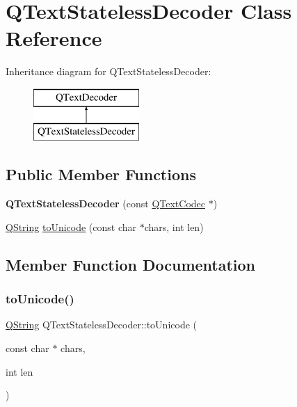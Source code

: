 \hypertarget{class_q_text_stateless_decoder}{}\section{Q\+Text\+Stateless\+Decoder Class Reference}
\label{class_q_text_stateless_decoder}
Inheritance diagram for Q\+Text\+Stateless\+Decoder\+:\begin{figure}[H]
\begin{center}
\leavevmode
\includegraphics[height=2.000000cm]{class_q_text_stateless_decoder}
\end{center}
\end{figure}
\subsection*{Public Member Functions}
\begin{DoxyCompactItemize}
\item 
\mbox{\label{class_q_text_stateless_decoder_a25882faf6ae2af20a0c8769e65bd88c0}} 
{\bfseries Q\+Text\+Stateless\+Decoder} (const \mbox{\hyperlink{class_q_text_codec}{Q\+Text\+Codec}} $\ast$)
\item 
\mbox{\hyperlink{class_q_string}{Q\+String}} \mbox{\hyperlink{class_q_text_stateless_decoder_a4f9dcd7c88b39b8e56b87ce9e6d7fd44}{to\+Unicode}} (const char $\ast$chars, int len)
\end{DoxyCompactItemize}


\subsection{Member Function Documentation}
\mbox{\label{class_q_text_stateless_decoder_a4f9dcd7c88b39b8e56b87ce9e6d7fd44}} 
\subsubsection{\texorpdfstring{toUnicode()}{toUnicode()}}
{\footnotesize\ttfamily \mbox{\hyperlink{class_q_string}{Q\+String}} Q\+Text\+Stateless\+Decoder\+::to\+Unicode (\begin{DoxyParamCaption}\item[{const char $\ast$}]{chars,  }\item[{int}]{len }\end{DoxyParamCaption})\hspace{0.3cm}{\ttfamily [virtual]}}

